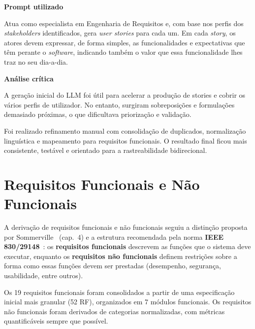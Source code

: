     \begin{tcolorbox}[title=Interação com o LLM]
    \textbf{Prompt utilizado}

    Atua como especialista em Engenharia de Requisitos e, com base nos perfis dos \textit{stakeholders} identificados, gera \textit{user stories} para cada um. Em cada \textit{story}, os atores devem expressar, de forma simples, as funcionalidades e expectativas que têm perante o \textit{software}, indicando também o valor que essa funcionalidade lhes traz no seu dia-a-dia.

    \tcblower

    \textbf{Análise crítica}

    A geração inicial do LLM foi útil para acelerar a produção de stories e cobrir os vários perfis de utilizador. No entanto, surgiram sobreposições e formulações demasiado próximas, o que dificultava priorização e validação.

    Foi realizado refinamento manual com consolidação de duplicados, normalização linguística e mapeamento para requisitos funcionais. O resultado final ficou mais consistente, testável e orientado para a rastreabilidade bidirecional.
    \end{tcolorbox}

\section{Requisitos Funcionais e Não Funcionais}

    A derivação de requisitos funcionais e não funcionais seguiu a distinção proposta por Sommerville~\cite{sommerville2016} (cap.~4) e a estrutura recomendada pela norma \textbf{IEEE 830/29148}~\cite{ieee830,ieee29148}: os \textbf{requisitos funcionais} descrevem as funções que o sistema deve executar, enquanto os \textbf{requisitos não funcionais} definem restrições sobre a forma como essas funções devem ser prestadas (desempenho, segurança, usabilidade, entre outros).

    Os 19 requisitos funcionais foram consolidados a partir de uma especificação inicial mais granular (52 RF), organizados em 7 módulos funcionais. Os requisitos não funcionais foram derivados de categorias normalizadas, com métricas quantificáveis sempre que possível.

